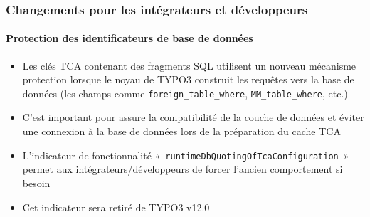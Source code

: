%

\begin{frame}[fragile]
	\frametitle{Changements pour les intégrateurs et développeurs}
	\framesubtitle{Protection des identificateurs de base de données}


	\begin{itemize}
		\item Les clés TCA contenant des fragments SQL utilisent un nouveau mécanisme protection lorsque
		    le noyau de TYPO3 construit les requêtes vers la base de données\newline
			\small(les champs comme \texttt{foreign\_table\_where}, \texttt{MM\_table\_where}, etc.)\normalsize
		\item C'est important pour assure la compatibilité de la couche de données et éviter
			une connexion à la base de données lors de la préparation du cache TCA
		\item L'indicateur de fonctionnalité «~\texttt{runtimeDbQuotingOfTcaConfiguration}~» permet
		 	aux intégrateurs/développeurs de forcer l'ancien comportement si besoin
		\item Cet indicateur sera retiré de TYPO3 v12.0
	\end{itemize}

\end{frame}

